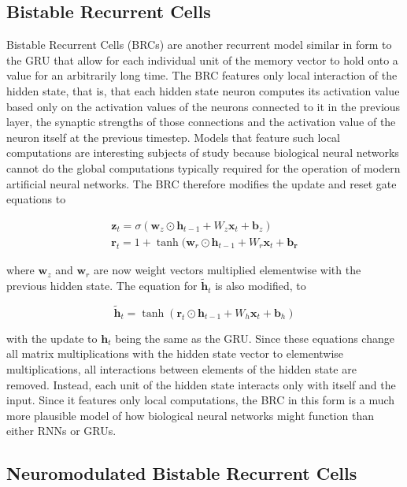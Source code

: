 \subsection*{Bistable Recurrent Cells}

 Bistable Recurrent Cells (BRCs) \cite{vecoven2021brc} are another recurrent model similar in form to the GRU that allow for each individual unit of the memory vector to hold onto a value for an arbitrarily long time. The BRC features only local interaction of the hidden state, that is, that each hidden state neuron computes its activation value based only on the activation values of the neurons connected to it in the previous layer, the synaptic strengths of those connections and the activation value of the neuron itself at the previous timestep. Models that feature such local computations are interesting subjects of study because biological neural networks cannot do the global computations typically required for the operation of modern artificial neural networks. The BRC therefore modifies the update and reset gate equations to

\begin{gather*}
	\mathbf{z}_t = \sigma(\mathbf{w}_z \odot \mathbf{h}_{t-1} + W_z \mathbf{x}_t + \mathbf{b}_z)\\
	\mathbf{r}_t = 1 + \tanh(\mathbf{w}_r \odot \mathbf{h}_{t-1} + W_r \mathbf{x}_t + \mathbf{b_r}
\end{gather*}

where \(\mathbf{w}_z\) and \(\mathbf{w}_r\) are now weight vectors multiplied elementwise with the previous hidden state. The equation for \(\mathbf{\tilde{h}}_t\) is also modified, to

\[ \mathbf{\tilde{h}}_t = \tanh(\mathbf{r}_t \odot \mathbf{h}_{t-1} + W_h \mathbf{x}_t + \mathbf{b}_h) \]

with the update to \(\mathbf{h}_t\) being the same as the GRU. Since these equations change all matrix multiplications with the hidden state vector to elementwise multiplications, all interactions between elements of the hidden state are removed. Instead, each unit of the hidden state interacts only with itself and the input. Since it features only local computations, the BRC in this form is a much more plausible model of how biological neural networks might function than either RNNs or GRUs.




\subsection*{Neuromodulated Bistable Recurrent Cells}

